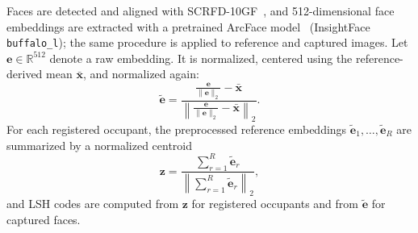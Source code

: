 \documentclass[pdflatex,sn-mathphys-num]{sn-jnl}%
\providecommand{\code}[1]{\texttt{#1}}%
\theoremstyle{thmstyleone}%
\theoremstyle{thmstyletwo}%
\theoremstyle{thmstylethree}%
\begin{document}
Faces are detected and aligned with SCRFD-10GF~\cite{guo2022}, and 512-dimensional face embeddings are extracted with a pretrained ArcFace model~\cite{deng2019} (InsightFace \code{buffalo\_l}); the same procedure is applied to reference and captured images. Let $\mathbf{e} \in \mathbb{R}^{512}$ denote a raw embedding. It is normalized, centered using the reference-derived mean $\bar{\mathbf{x}}$, and normalized again:
\begin{equation}
    \tilde{\mathbf{e}}
    =
    \frac{
        \frac{\mathbf{e}}{\|\mathbf{e}\|_2}
        - \bar{\mathbf{x}}
    }{
        \left\|
        \frac{\mathbf{e}}{\|\mathbf{e}\|_2}
        - \bar{\mathbf{x}}
        \right\|_2
    }.
    \label{eq:embedding_preprocessing}
\end{equation}
For each registered occupant, the preprocessed reference embeddings $\tilde{\mathbf{e}}_1,\ldots,\tilde{\mathbf{e}}_R$ are summarized by a normalized centroid
\begin{equation}
    \mathbf{z}
    =
    \frac{
        \sum_{r=1}^{R}\tilde{\mathbf{e}}_r
    }{
        \left\|\sum_{r=1}^{R}\tilde{\mathbf{e}}_r\right\|_2
    },
    \label{eq:identity_centroid}
\end{equation}
and LSH codes are computed from $\mathbf{z}$ for registered occupants and from $\tilde{\mathbf{e}}$ for captured faces.
\end{document}
